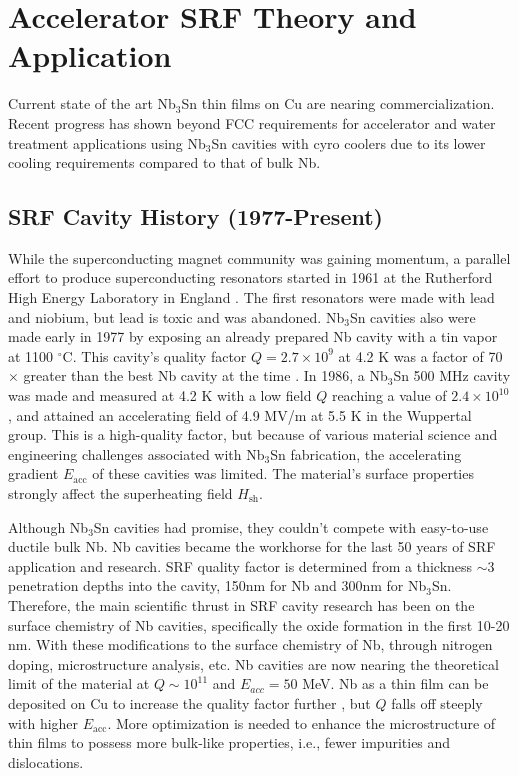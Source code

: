 \chapter{Accelerator SRF Theory and Application}\label{appendix:SRF} 
    
Current state of the art Nb$_3$Sn thin films on Cu are nearing commercialization. Recent progress has shown beyond FCC requirements for accelerator and water treatment applications using Nb$_3$Sn cavities with cyro coolers due to its lower cooling requirements compared to that of bulk Nb. 


    \section{SRF Cavity History (1977-Present)}

    While the superconducting magnet community was gaining momentum, a parallel effort to produce superconducting resonators started in 1961 at the Rutherford High Energy Laboratory in England \cite{banfordFeasibilitySuperconductingProton1961}. The first resonators were made with lead and niobium, but lead is toxic and was abandoned. Nb$_3$Sn cavities also were made early in 1977 by exposing an already prepared Nb cavity with a tin vapor at 1100 $^\circ$C. This cavity's quality factor $Q = 2.7\times10^{9}$ at 4.2 K was a factor of 70$\times$ greater than the best Nb cavity at the time \cite{hillenbrandSuperconductingNbLt1977}. In 1986, a Nb$_3$Sn 500 MHz cavity was made and measured at 4.2 K with a low field $Q$ reaching a value of $2.4\times10^{10}$, and attained an accelerating field of 4.9 MV/m at 5.5 K in the Wuppertal group\cite{arnolds-mayer500MHzSingle1986}. This is a high-quality factor, but because of various material science and engineering challenges associated with Nb$_3$Sn fabrication, the accelerating gradient $E_{\text{acc}}$ of these cavities was limited. The material's surface properties strongly affect the superheating field $H_{\text{sh}}$. 
    
    Although Nb$_3$Sn cavities had promise, they couldn't compete with easy-to-use ductile bulk Nb. Nb cavities became the workhorse for the last 50 years of SRF application and research\cite{Padamsee:2017ohf}. SRF quality factor is determined from a thickness $\sim$3 penetration depths into the cavity, 150nm for Nb and 300nm for Nb$_3$Sn. Therefore, the main scientific thrust in SRF cavity research has been on the surface chemistry of Nb cavities, specifically the oxide formation in the first 10-20 nm. With these modifications to the surface chemistry of Nb, through nitrogen doping\cite{chetriMethodologyCharacterizationSurface2023}, microstructure analysis\cite{Balachandran:2021zuv}, etc. Nb cavities are now nearing the theoretical limit of the material at $Q \sim 10^{11}$ and $E_{acc} = 50$ MeV. Nb as a thin film can be deposited on Cu to increase the quality factor further \cite{Valente-Feliciano:2015qkf}, but $Q$ falls off steeply with higher $E_{\text{acc}}$. More optimization is needed to enhance the microstructure of thin films to possess more bulk-like properties, i.e., fewer impurities and dislocations.
    
